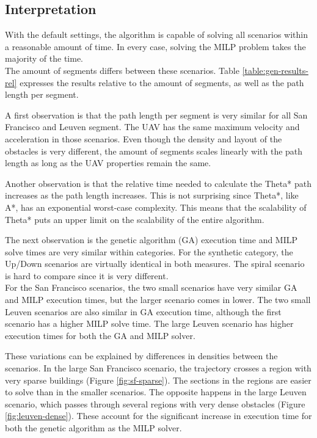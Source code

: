 \subsection{Interpretation}
With the default settings, the algorithm is capable of solving all scenarios within a reasonable amount of time. In every case, solving the MILP problem takes the majority of the time. \\
The amount of segments differs between these scenarios. Table \ref{table:gen-results-rel} expresses the results relative to the amount of segments, as well as the path length per segment.
\par
A first observation is that the path length per segment is very similar for all San Francisco and Leuven segment. The UAV has the same maximum velocity and acceleration in those scenarios. Even though the density and layout of the obstacles is very different, the amount of segments scales linearly with the path length as long as the UAV properties remain the same.
\par
Another observation is that the relative time needed to calculate the Theta* path increases as the path length increases. This is not surprising since Theta*, like A*, has an exponential worst-case complexity. This means that the scalability of Theta* puts an upper limit on the scalability of the entire algorithm.
\par
The next observation is the genetic algorithm (GA) execution time and MILP solve times are very similar within categories. For the synthetic category, the Up/Down scenarios are virtually identical in both measures. The spiral scenario is hard to compare since it is very different.  \\
For the San Francisco scenarios, the two small scenarios have very similar GA and MILP execution times, but the larger scenario comes in lower. The two small Leuven scenarios are also similar in GA execution time, although the first scenario has a higher MILP solve time. The large Leuven scenario has higher execution times for both the GA and MILP solver.
\par
These variations can be explained by differences in densities between the scenarios. In the large San Francisco scenario, the trajectory crosses a region with very sparse buildings (Figure \ref{fig:sf-sparse}). The sections in the regions are easier to solve than in the smaller scenarios. The opposite happens in the large Leuven scenario, which passes through several regions with very dense obstacles (Figure \ref{fig:leuven-dense}). These account for the significant increase in execution time for both the genetic algorithm as the MILP solver.

